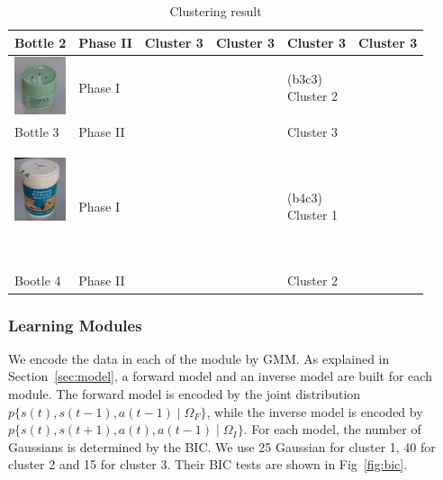 \begin{table}
\begin{tabular}{p{1.6cm} p{1.6cm}|p{2cm} p{2cm} p{2cm}  p{2cm} }
Bottle 2 & Phase II &       Cluster 3 &       Cluster 3 &       Cluster 3 &       Cluster 3 \\ \hline
{\parbox[c]{1em}{\includegraphics[width=1.5cm]{./fig/b3.jpg}} }
         & Phase I  &           &           &{\vspace{-0.7cm}}\pbox{2cm}{(b3c3) \\Cluster 2} &           \\
Bottle 3 & Phase II &           &           &       Cluster 3 &           \\ \hline
{\parbox[c]{1em}{\includegraphics[width=1.5cm]{./fig/b4.jpg}}\newline }
         & Phase I  &           &           &{\vspace{-0.7cm}}\pbox{2cm}{(b4c3) \\Cluster 1} &           \\
Bootle 4 & Phase II &           &           &       Cluster 2 &           \\ \hline
\end{tabular}
\caption{Clustering result}
\label{tab:cluster}
\end{table}


\subsubsection{Learning Modules}
\label{sec:module}
We encode the data in each of the module by GMM. As explained in Section~\ref{sec:model}, a forward model and an inverse model are built for each module. The forward model is encoded by the joint distribution $p\{s(t),s(t-1),a(t-1)\mid\Omega_F\}$, while the inverse model is encoded by $p\{s(t),s(t+1),a(t),a(t-1)\mid\Omega_I\}$. For each model, the number of Gaussians is determined by the BIC. We use 25 Gaussian for cluster 1, 40 for cluster 2 and 15 for cluster 3. Their BIC tests are shown in Fig~\ref{fig:bic}.

